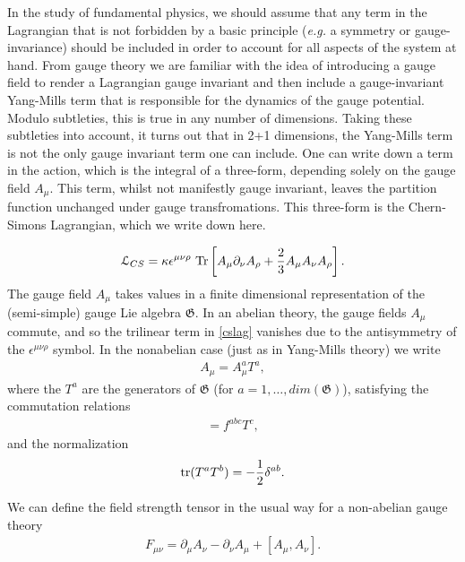     In the study of fundamental physics, we should assume that any term in the Lagrangian that is not forbidden by a basic principle (\textit{e.g.} a symmetry or gauge-invariance) should be included in order to account for all aspects of the system at hand. From gauge theory we are familiar with the idea of introducing a gauge field to render a Lagrangian gauge invariant and then include a gauge-invariant Yang-Mills term that is responsible for the dynamics of the gauge potential. Modulo subtleties, this is true in any number of dimensions. Taking these subtleties into account, it turns out that in 2+1 dimensions, the Yang-Mills term is not the only gauge invariant term one can include. One can write down a term in the action, which is the integral of a three-form, depending solely on the gauge field $A_{\mu}$. This term, whilst not manifestly gauge invariant, leaves the partition function unchanged under gauge transfromations. This three-form is the Chern-Simons Lagrangian, which we write down here.

\begin{equation}
    {\mathcal{L}}_{CS}= \kappa \epsilon^{\mu\nu\rho} \  \mathrm{Tr} \left[ A_\mu\partial_\nu A_\rho +{2\over 3} A_\mu A_\nu A_\rho \right].
\label{cslag}
\end{equation}
The gauge field $A_\mu$ takes values in a finite dimensional representation of
the (semi-simple) gauge Lie algebra ${\mathfrak{G}}$. In an abelian theory, the gauge fields
$A_\mu$ commute, and so the trilinear term in \eqref{cslag} vanishes due to the
antisymmetry of the $\epsilon^{\mu\nu\rho}$ symbol. In the nonabelian case (just as in Yang-Mills theory) we write
\begin{align}
    A_\mu=A_\mu^a T^a,
\end{align}
 where the $T^a$ are the generators of ${\mathfrak{G}}$ (for $a=1,\dots, dim({\mathfrak{G}})$), satisfying the commutation relations
 \begin{align}
    [T^a,T^b]=f^{abc}T^c,
 \end{align}
and the normalization 
\begin{align}
    {\rm tr}(T^a T^b)=-\frac{1}{2}\delta^{ab}.
\end{align}

We can define the field strength tensor in the usual way for a non-abelian gauge theory
\begin{align}
    F_{\mu \nu} = \partial_{\mu}A_{\nu} - \partial_{\nu} A_{\mu} + [A_{\mu}, A_{\nu}].
\end{align}




